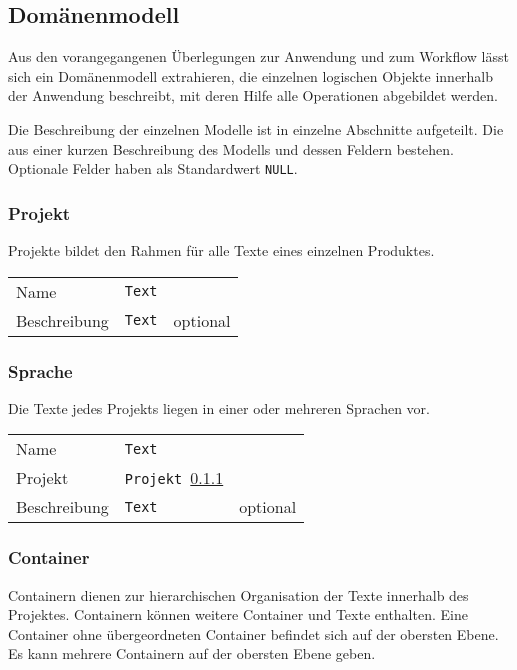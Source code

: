 \subsection{Domänenmodell}\label{l:domänenmodell}

Aus den vorangegangenen Überlegungen zur Anwendung und zum Workflow lässt sich ein Domänenmodell extrahieren, die einzelnen logischen Objekte innerhalb der Anwendung beschreibt, mit deren Hilfe alle Operationen abgebildet werden.

Die Beschreibung der einzelnen Modelle ist in einzelne Abschnitte aufgeteilt. Die aus einer kurzen Beschreibung des Modells und dessen Feldern bestehen. Optionale Felder haben als Standardwert \texttt{NULL}.

\subsubsection{Projekt}\label{model:projekt}

Projekte bildet den Rahmen für alle Texte eines einzelnen Produktes.

\begin{tabular}{@{}l l l}
\hline
Name&\texttt{Text}&\\
Beschreibung&\texttt{Text}&optional\\
\hline
\end{tabular}

\subsubsection{Sprache}\label{model:sprache}

Die Texte jedes Projekts liegen in einer oder mehreren Sprachen vor.

\begin{tabular}{@{}l l l}
\hline
Name&\texttt{Text}&\\
Projekt&\texttt{Projekt \ref{model:projekt}}&\\
Beschreibung&\texttt{Text}&optional\\
\hline
\end{tabular}

\subsubsection{Container}\label{model:container}

Containern dienen zur hierarchischen Organisation der Texte innerhalb des Projektes. Containern können weitere Container und Texte enthalten. Eine Container ohne übergeordneten Container befindet sich auf der obersten Ebene. Es kann mehrere Containern auf der obersten Ebene geben.

